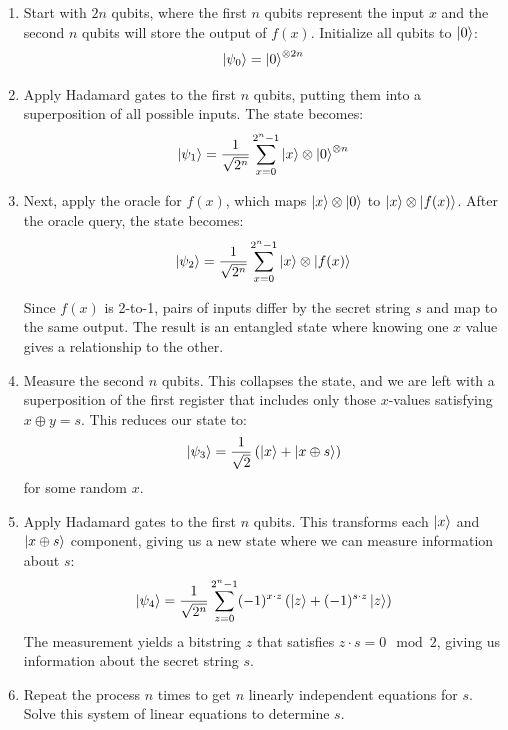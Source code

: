\documentclass{article}
\begin{document}
		\begin{enumerate}
			\item Start with \( 2n \) qubits, where the first \( n \) qubits represent the input \( x \) and the second \( n \) qubits will store the output of \( f(x) \). Initialize all qubits to \( \ket{0} \):
			\[
			\ket{\psi_0} = \ket{0}^{\otimes 2n}
			\]
		
			\item Apply Hadamard gates to the first \( n \) qubits, putting them into a superposition of all possible inputs. The state becomes:
			\[
			\ket{\psi_1} = \frac{1}{\sqrt{2^n}} \sum_{x=0}^{2^n - 1} \ket{x} \otimes \ket{0}^{\otimes n}
			\]
		
			\item Next, apply the oracle for \( f(x) \), which maps \( \ket{x} \otimes \ket{0} \) to \( \ket{x} \otimes \ket{f(x)} \). After the oracle query, the state becomes:
			\[
			\ket{\psi_2} = \frac{1}{\sqrt{2^n}} \sum_{x=0}^{2^n - 1} \ket{x} \otimes \ket{f(x)}
			\]
		
			Since \( f(x) \) is 2-to-1, pairs of inputs differ by the secret string \( s \) and map to the same output. The result is an entangled state where knowing one \( x \) value gives a relationship to the other.
		
			\item Measure the second \( n \) qubits. This collapses the state, and we are left with a superposition of the first register that includes only those \( x \)-values satisfying \( x \oplus y = s \). This reduces our state to:
			\[
			\ket{\psi_3} = \frac{1}{\sqrt{2}} \left( \ket{x} + \ket{x \oplus s} \right)
			\]
			for some random \( x \).
		
			\item Apply Hadamard gates to the first \( n \) qubits. This transforms each \( \ket{x} \) and \( \ket{x \oplus s} \) component, giving us a new state where we can measure information about \( s \):
			\[
			\ket{\psi_4} = \frac{1}{\sqrt{2^n}} \sum_{z=0}^{2^n - 1} (-1)^{x \cdot z} \left( \ket{z} + (-1)^{s \cdot z} \ket{z} \right)
			\]
			The measurement yields a bitstring \( z \) that satisfies \( z \cdot s = 0 \mod 2 \), giving us information about the secret string \( s \).
		
			\item Repeat the process \( n \) times to get \( n \) linearly independent equations for \( s \). Solve this system of linear equations to determine \( s \).
		\end{enumerate}
		
\end{document}
